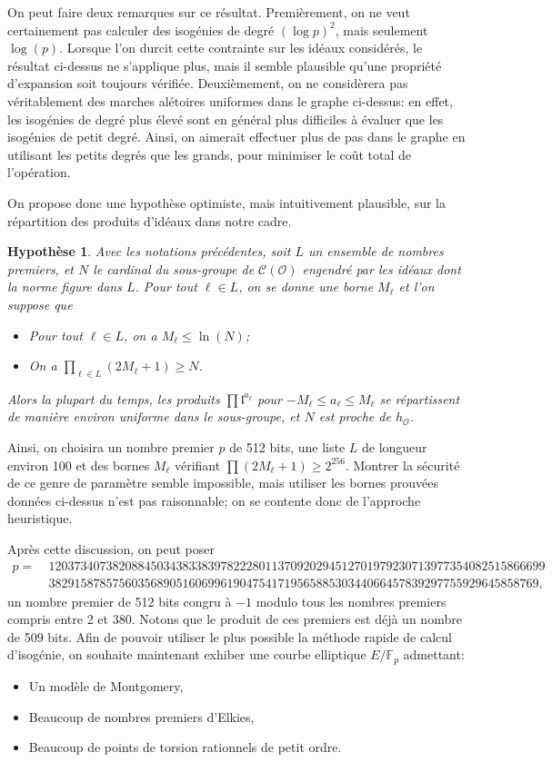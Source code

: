 \documentclass[11pt,a4paper]{article}
\newcommand{\F}{\mathbb{F}}
\renewcommand{\O}{\mathcal{O}}
\newcommand{\Cl}{\mathcal{C}}
\renewcommand{\frak}{\mathfrak}
\renewcommand{\v}{\vspace{5mm}}
\newtheorem*{hyp}{Hypothèse}
\theoremstyle{definition}
\begin{document}
On peut faire deux remarques sur ce résultat. Premièrement, on ne veut certainement pas calculer des isogénies de degré $(\log p)^2$, mais seulement $\log(p)$.
Lorsque l'on durcit cette contrainte sur les idéaux considérés, le résultat ci-dessus ne s'applique plus, mais il semble plausible qu'une propriété d'expansion soit toujours vérifiée. Deuxièmement, on ne considèrera pas véritablement des marches alétoires uniformes dans le graphe ci-dessus: en effet, les isogénies de degré plus élevé sont en général plus difficiles à évaluer que les isogénies de petit degré. Ainsi, on aimerait effectuer plus de pas dans le graphe en utilisant les petits degrés que les grands, pour minimiser le coût total de l'opération.

On propose donc une hypothèse optimiste, mais intuitivement plausible, sur la répartition des produits d'idéaux dans notre cadre. 

\begin{hyp}
Avec les notations précédentes, soit $L$ un ensemble de nombres premiers, et $N$ le cardinal du sous-groupe de $\Cl(\O)$ engendré par les idéaux dont la norme figure dans $L$. Pour tout $\ell\in L$, on se donne une borne $M_\ell$ et l'on suppose que
\begin{itemize}
\item[•] Pour tout $\ell\in L$, on a $M_\ell \leq \ln(N)$;
\item[•] On a $\prod_{\ell\in L} (2M_\ell + 1) \geq N$.
\end{itemize}
Alors la plupart du temps, les produits $\prod {\frak l}^{a_\ell}$ pour $-M_\ell \leq a_\ell\leq M_\ell$ se répartissent de manière environ uniforme dans le sous-groupe, et $N$ est proche de $h_\O$.
\end{hyp}

Ainsi, on choisira un nombre premier $p$ de 512 bits, une liste $L$ de longueur environ 100 et des bornes $M_\ell$ vérifiant $\prod (2 M_\ell +1) \geq 2^{256}$. Montrer la sécurité de ce genre de paramètre semble impossible, mais utiliser les bornes prouvées données ci-dessus n'est pas raisonnable; on se contente donc de l'approche heuristique.

\v
Après cette discussion, on peut poser
$$\begin{aligned}
p =\ &120373407382088450343833839782228011370920294512701979230713977354082515866699 \\ &38291587857560356890516069961904754171956588530344066457839297755929645858769,
\end{aligned}
$$
un nombre premier de 512 bits congru à $-1$ modulo tous les nombres premiers compris entre 2 et 380. Notons que le produit de ces premiers est déjà un nombre de 509 bits. Afin de pouvoir utiliser le plus possible la méthode rapide de calcul d'isogénie, on souhaite maintenant exhiber une courbe elliptique $E/\F_p$ admettant:
\begin{itemize}
\item[•] Un modèle de Montgomery,
\item[•] Beaucoup de nombres premiers d'Elkies,
\item[•] Beaucoup de points de torsion rationnels de petit ordre.
\end{itemize}
\end{document}

